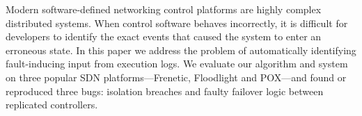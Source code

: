 Modern software-defined networking control platforms are highly complex distributed
systems. When control software behaves incorrectly, it is difficult
for developers to identify the exact events that caused the system to enter
an erroneous state. In this paper we address the problem of automatically
identifying fault-inducing input from execution logs. We evaluate our
algorithm and system on three popular SDN platforms---Frenetic, Floodlight and POX---and
found or reproduced three bugs:
isolation breaches and faulty failover logic between replicated controllers. 

